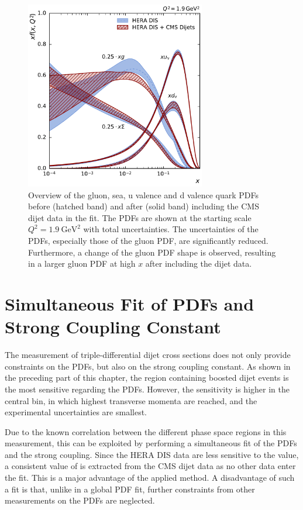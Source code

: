 \begin{figure}[tbp]
  \centering
  \includegraphics[width=0.7\textwidth]{figures/pdf_constraints/pdfcomp_direct_overview_1.9.pdf}\hfill%
  \caption[Overview of gluon and quark PDFs]{Overview of the gluon, sea, u
  valence and d valence quark PDFs before (hatched band) and after (solid band)
  including the CMS dijet data in the fit. The PDFs are shown at the starting
  scale $Q^2 = \SI{1.9}{\GeV \squared}$ with total
  uncertainties. The uncertainties of the PDFs, especially those of the gluon PDF, are
  significantly reduced. Furthermore, a change of the gluon PDF shape is observed, resulting in a
  larger gluon PDF at high $x$ after including the dijet data.}
  \label{fig:pdfconstraints:overview:19}
\end{figure}

\section{Simultaneous Fit of PDFs and Strong Coupling Constant}

The measurement of triple-differential dijet cross sections does not only
provide constraints on the PDFs, but also on the strong coupling constant. As
shown in the preceding part of this chapter, the region containing boosted dijet events is
the most sensitive regarding the PDFs. However, the \as sensitivity is higher in
the central bin, in which highest transverse momenta are reached, and the
experimental uncertainties are smallest.

Due to the known correlation between the different phase space regions in this
measurement, this can be exploited by performing a simultaneous fit of the PDFs and the
strong coupling. Since the HERA DIS data are less sensitive
to the \asmz value, a consistent value of \asmz is extracted from the CMS
dijet data as no other data enter the fit. This is a major advantage of the
applied method. A disadvantage of such a fit is that, unlike in a global PDF fit, further
constraints from other measurements on the PDFs are neglected. 

